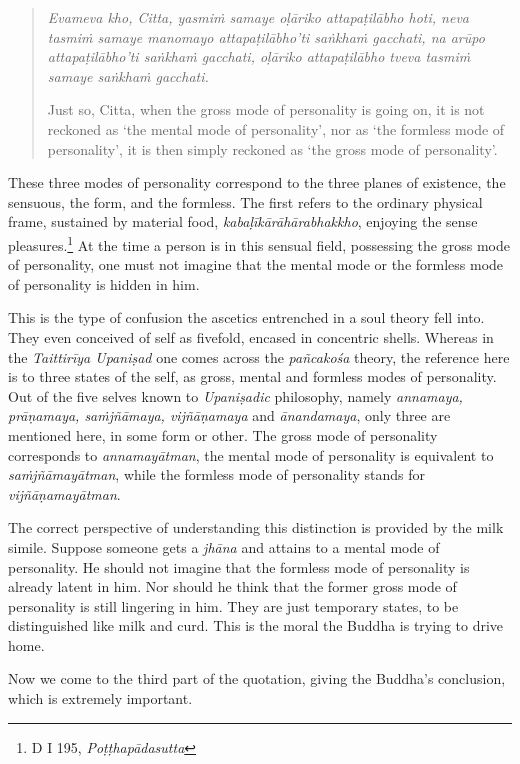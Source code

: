 \begin{quote}
\emph{Evameva kho, Citta, yasmiṁ samaye oḷāriko attapaṭilābho hoti, neva tasmiṁ samaye manomayo attapaṭilābho'ti saṅkhaṁ gacchati, na arūpo attapaṭilābho'ti saṅkhaṁ gacchati, oḷāriko attapaṭilābho tveva tasmiṁ samaye saṅkhaṁ gacchati.}

Just so, Citta, when the gross mode of personality is going on, it is not reckoned as `the mental mode of personality', nor as `the formless mode of personality', it is then simply reckoned as `the gross mode of personality'.
\end{quote}

These three modes of personality correspond to the three planes of existence, the sensuous, the form, and the formless. The first refers to the ordinary physical frame, sustained by material food, \emph{kabaḷīkārāhārabhakkho}, enjoying the sense pleasures.\footnote{D I 195, \emph{Poṭṭhapādasutta}} At the time a person is in this sensual field, possessing the gross mode of personality, one must not imagine that the mental mode or the formless mode of personality is hidden in him.

This is the type of confusion the ascetics entrenched in a soul theory fell into. They even conceived of self as fivefold, encased in concentric shells. Whereas in the \emph{Taittirīya Upaniṣad} one comes across the \emph{pañcakośa} theory, the reference here is to three states of the self, as gross, mental and formless modes of personality. Out of the five selves known to \emph{Upaniṣadic} philosophy, namely \emph{annamaya, prāṇamaya, saṁjñāmaya, vijñāṇamaya} and \emph{ānandamaya}, only three are mentioned here, in some form or other. The gross mode of personality corresponds to \emph{annamayātman}, the mental mode of personality is equivalent to \emph{saṁjñāmayātman}, while the formless mode of personality stands for \emph{vijñāṇamayātman}.

The correct perspective of understanding this distinction is provided by the milk simile. Suppose someone gets a \emph{jhāna} and attains to a mental mode of personality. He should not imagine that the formless mode of personality is already latent in him. Nor should he think that the former gross mode of personality is still lingering in him. They are just temporary states, to be distinguished like milk and curd. This is the moral the Buddha is trying to drive home.

Now we come to the third part of the quotation, giving the Buddha's conclusion, which is extremely important.

